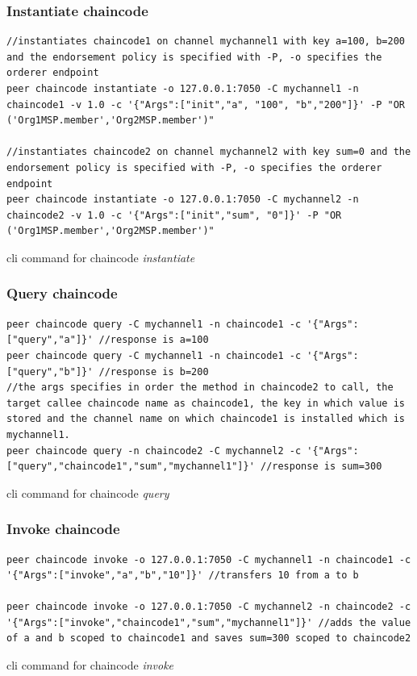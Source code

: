\documentclass[
  a4paper,  %
  twoside,  %
  bibliography=totoc,
  headsepline,
  cleardoublepage=empty,
  parskip=half,
  draft=false
]{scrbook}
\begin{document}
\subsubsection{Instantiate chaincode}
\begin{Listing}[h!]
\begin{lstlisting}
//instantiates chaincode1 on channel mychannel1 with key a=100, b=200 and the endorsement policy is specified with -P, -o specifies the orderer endpoint
peer chaincode instantiate -o 127.0.0.1:7050 -C mychannel1 -n chaincode1 -v 1.0 -c '{"Args":["init","a", "100", "b","200"]}' -P "OR ('Org1MSP.member','Org2MSP.member')"

//instantiates chaincode2 on channel mychannel2 with key sum=0 and the endorsement policy is specified with -P, -o specifies the orderer endpoint
peer chaincode instantiate -o 127.0.0.1:7050 -C mychannel2 -n chaincode2 -v 1.0 -c '{"Args":["init","sum", "0"]}' -P "OR ('Org1MSP.member','Org2MSP.member')"
\end{lstlisting}
\caption{cli command for chaincode \textit{instantiate}}
\label{lst:cin2}
\end{Listing}
\subsubsection{Query chaincode}
\begin{Listing}[h!]
\begin{lstlisting}
peer chaincode query -C mychannel1 -n chaincode1 -c '{"Args":["query","a"]}' //response is a=100
peer chaincode query -C mychannel1 -n chaincode1 -c '{"Args":["query","b"]}' //response is b=200
//the args specifies in order the method in chaincode2 to call, the target callee chaincode name as chaincode1, the key in which value is stored and the channel name on which chaincode1 is installed which is mychannel1.
peer chaincode query -n chaincode2 -C mychannel2 -c '{"Args":["query","chaincode1","sum","mychannel1"]}' //response is sum=300
\end{lstlisting}
\caption{cli command for chaincode \textit{query}}
\label{lst:cq2}
\end{Listing}
\subsubsection{Invoke chaincode}
\begin{Listing}[h!]
\begin{lstlisting}
peer chaincode invoke -o 127.0.0.1:7050 -C mychannel1 -n chaincode1 -c '{"Args":["invoke","a","b","10"]}' //transfers 10 from a to b

peer chaincode invoke -o 127.0.0.1:7050 -C mychannel2 -n chaincode2 -c '{"Args":["invoke","chaincode1","sum","mychannel1"]}' //adds the value of a and b scoped to chaincode1 and saves sum=300 scoped to chaincode2
\end{lstlisting}
\caption{cli command for chaincode \textit{invoke}}
\label{lst:civ2}
\end{Listing}
\clearpage
\end{document}
